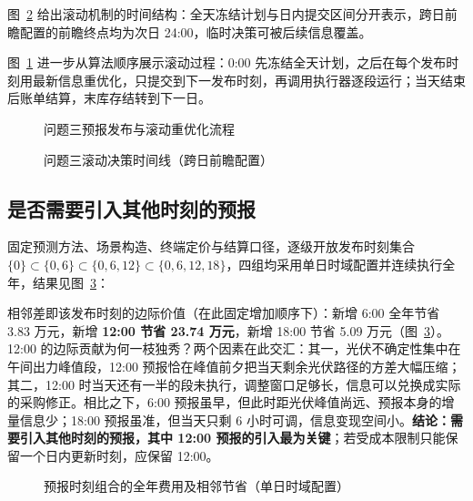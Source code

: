 图~\ref{fig:fig_f08_rolling_timeline} 给出滚动机制的时间结构：全天冻结计划与日内提交区间分开表示，跨日前瞻配置的前瞻终点均为次日 24:00，临时决策可被后续信息覆盖。

图~\ref{fig:fig_f20_rolling_flowchart} 进一步从算法顺序展示滚动过程：0:00 先冻结全天计划，之后在每个发布时刻用最新信息重优化，只提交到下一发布时刻，再调用执行器逐段运行；当天结束后账单结算，末库存结转到下一日。

\begin{figure}[!htbp]\centering
{}
\caption{问题三预报发布与滚动重优化流程}\label{fig:fig_f20_rolling_flowchart}
\end{figure}

\begin{figure}[!htbp]\centering
{}
\caption{问题三滚动决策时间线（跨日前瞻配置）}\label{fig:fig_f08_rolling_timeline}
\end{figure}

\subsection{是否需要引入其他时刻的预报}\label{sec:q3issues}
固定预测方法、场景构造、终端定价与结算口径，逐级开放发布时刻集合 $\{0\}\subset\{0,6\}\subset\{0,6,12\}\subset\{0,6,12,18\}$，四组均采用单日时域配置并连续执行全年，结果见图~\ref{fig:fig_f09_issue_marginal}：



相邻差即该发布时刻的边际价值（在此固定增加顺序下）：新增 6:00 全年节省 3.83 万元，新增 \textbf{12:00 节省 23.74 万元}，新增 18:00 节省 5.09 万元（图~\ref{fig:fig_f09_issue_marginal}）。12:00 的边际贡献为何一枝独秀？两个因素在此交汇：其一，光伏不确定性集中在午间出力峰值段，12:00 预报恰在峰值前夕把当天剩余光伏路径的方差大幅压缩；其二，12:00 时当天还有一半的段未执行，调整窗口足够长，信息可以兑换成实际的采购修正。相比之下，6:00 预报虽早，但此时距光伏峰值尚远、预报本身的增量信息少；18:00 预报虽准，但当天只剩 6 小时可调，信息变现空间小。\textbf{结论：需要引入其他时刻的预报，其中 12:00 预报的引入最为关键}；若受成本限制只能保留一个日内更新时刻，应保留 12:00。

\begin{figure}[!htbp]\centering
{}
\caption{预报时刻组合的全年费用及相邻节省（单日时域配置）}\label{fig:fig_f09_issue_marginal}
\end{figure}

